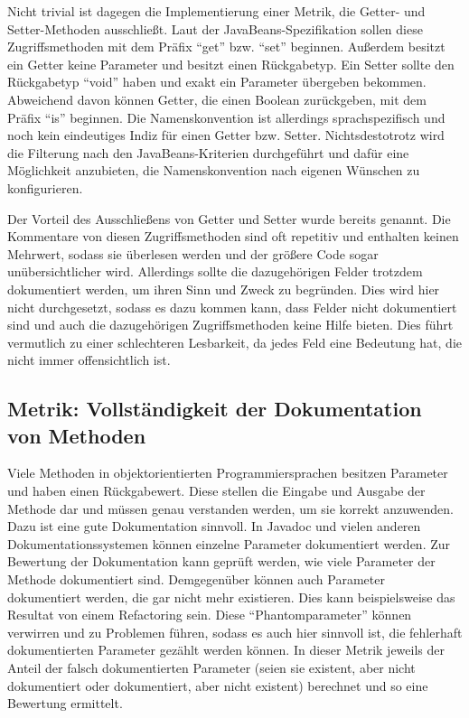 Nicht trivial ist dagegen die Implementierung einer Metrik, die Getter- und Setter-Methoden ausschließt. Laut der JavaBeans-Spezifikation \cite[S. 55]{javabeans} sollen diese Zugriffsmethoden mit dem Präfix \enquote{get} bzw. \enquote{set} beginnen. Außerdem besitzt ein Getter keine Parameter und besitzt einen Rückgabetyp. Ein Setter sollte den Rückgabetyp \enquote{void} haben und exakt ein Parameter übergeben bekommen. Abweichend davon können Getter, die einen Boolean zurückgeben, mit dem Präfix \enquote{is} beginnen. Die Namenskonvention ist allerdings sprachspezifisch und noch kein eindeutiges Indiz für einen Getter bzw. Setter. Nichtsdestotrotz wird die Filterung nach den JavaBeans-Kriterien durchgeführt und dafür eine Möglichkeit anzubieten, die Namenskonvention nach eigenen Wünschen zu konfigurieren. 

Der Vorteil des Ausschließens von Getter und Setter wurde bereits genannt. Die Kommentare von diesen Zugriffsmethoden sind oft repetitiv und enthalten keinen Mehrwert, sodass sie überlesen werden und der größere Code sogar unübersichtlicher wird. Allerdings sollte die dazugehörigen Felder trotzdem dokumentiert werden, um ihren Sinn und Zweck zu begründen. Dies wird hier nicht durchgesetzt, sodass es dazu kommen kann, dass Felder nicht dokumentiert sind und auch die dazugehörigen Zugriffsmethoden keine Hilfe bieten. Dies führt vermutlich zu einer schlechteren Lesbarkeit, da jedes Feld eine Bedeutung hat, die nicht immer offensichtlich ist.

 \subsection{Metrik: Vollständigkeit der Dokumentation von  Methoden}\label{chapter:method_doc}
 
Viele Methoden in objektorientierten Programmiersprachen besitzen Parameter und haben einen Rückgabewert. Diese stellen die Eingabe und Ausgabe der Methode dar und müssen genau verstanden werden, um sie korrekt anzuwenden. Dazu ist eine gute Dokumentation sinnvoll. In Javadoc und vielen anderen Dokumentationssystemen können einzelne Parameter dokumentiert werden. Zur Bewertung der Dokumentation kann geprüft werden, wie viele Parameter der Methode dokumentiert sind. Demgegenüber können auch Parameter dokumentiert werden, die gar nicht mehr existieren. Dies kann beispielsweise das Resultat von einem Refactoring sein. Diese \enquote{Phantomparameter} können verwirren und zu Problemen führen, sodass es auch hier sinnvoll ist, die fehlerhaft dokumentierten Parameter gezählt werden können. In dieser Metrik jeweils der Anteil der falsch dokumentierten Parameter (seien sie existent, aber nicht dokumentiert oder dokumentiert, aber nicht existent) berechnet und so eine Bewertung ermittelt.
 
